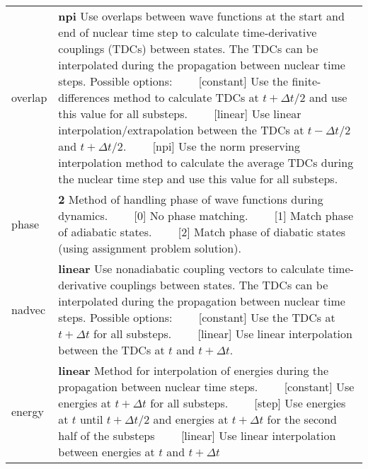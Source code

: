\documentclass{report}
\newcommand{\tabitem}{~~\llap{--}~~}
\begin{document}
\begin{tabularx}{\textwidth}{ m{2.5cm} X }
overlap			&
	\textbf{npi}	\newline
	Use overlaps between wave functions at the start and end of nuclear time step to calculate time-derivative couplings (TDCs) between states. The TDCs can be interpolated during the propagation between nuclear time steps. Possible options: \newline
	\tabitem [constant] Use the finite-differences method to calculate TDCs at $ t + \Delta t / 2 $ and use this value for all substeps. \newline
	\tabitem [linear] Use linear interpolation/extrapolation between the TDCs at $ t - \Delta t / 2 $ and $ t + \Delta t / 2 $. \newline
	\tabitem [npi] Use the norm preserving interpolation method to calculate the average TDCs during the nuclear time step and use this value for all substeps.\\

phase			&
	\textbf{2} \newline
	Method of handling phase of wave functions during dynamics. \newline
	\tabitem [0] No phase matching. \newline
	\tabitem [1] Match phase of adiabatic states. \newline
	\tabitem [2] Match phase of diabatic states (using assignment problem solution). \\

nadvec			&
	\textbf{linear}		\newline
	Use nonadiabatic coupling vectors to calculate time-derivative couplings between states.  The TDCs can be interpolated during the propagation between nuclear time steps. Possible options: \newline
	\tabitem [constant] Use the TDCs at $ t + \Delta t$ for all substeps. \newline
	\tabitem [linear] Use linear interpolation between the TDCs at $ t $ and $ t + \Delta t $. \\
	
energy			&
	\textbf{linear} \newline
	Method for interpolation of energies during the propagation between nuclear time steps. \newline
	\tabitem [constant] Use energies at $ t + \Delta t$ for all substeps. \newline
	\tabitem [step] Use energies at $ t $ until $ t + \Delta t / 2$ and energies at $ t + \Delta t $ for the second half of the substeps \newline
	\tabitem [linear] Use linear interpolation between energies at $ t $ and $ t + \Delta t $	\\
	

\end{tabularx}
\end{document}

